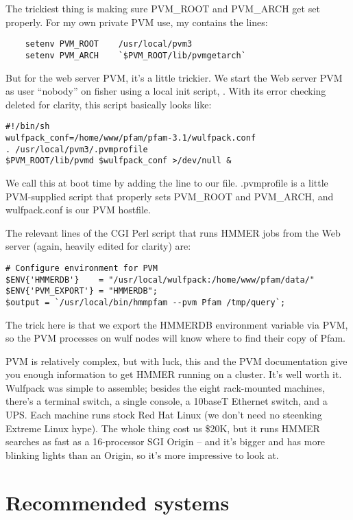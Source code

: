 The trickiest thing is making sure PVM\_ROOT and PVM\_ARCH get set
properly.  For my own private PVM use, my  contains the lines:
\begin{verbatim}
	setenv PVM_ROOT    /usr/local/pvm3
	setenv PVM_ARCH    `$PVM_ROOT/lib/pvmgetarch`
\end{verbatim}
But for the web server PVM, it's a little trickier. We start the Web
server PVM as user ``nobody'' on fisher using a local init script,
. With its error checking deleted for
clarity, this script basically looks like:

\begin{verbatim}
#!/bin/sh
wulfpack_conf=/home/www/pfam/pfam-3.1/wulfpack.conf
. /usr/local/pvm3/.pvmprofile
$PVM_ROOT/lib/pvmd $wulfpack_conf >/dev/null &
\end{verbatim}

We call this at boot time by adding the line
to our  file. .pvmprofile is a little PVM-supplied
script that properly sets PVM\_ROOT and PVM\_ARCH, and wulfpack.conf
is our PVM hostfile.

The relevant lines of the CGI Perl script that runs HMMER jobs from
the Web server (again, heavily edited for clarity) are:

\begin{verbatim}
# Configure environment for PVM
$ENV{'HMMERDB'}    = "/usr/local/wulfpack:/home/www/pfam/data/"
$ENV{'PVM_EXPORT'} = "HMMERDB";
$output = `/usr/local/bin/hmmpfam --pvm Pfam /tmp/query`;
\end{verbatim}

The trick here is that we export the HMMERDB environment variable via
PVM, so the PVM processes on wulf nodes will know where to find their
copy of Pfam.

PVM is relatively complex, but with luck, this and the PVM
documentation give you enough information to get HMMER running on a
cluster. It's well worth it.  Wulfpack was simple to assemble; besides
the eight rack-mounted machines, there's a terminal switch, a single
console, a 10baseT Ethernet switch, and a UPS. Each machine runs stock
Red Hat Linux (we don't need no steenking Extreme Linux hype). The
whole thing cost us \$20K, but it runs HMMER searches as fast as a
16-processor SGI Origin -- and it's bigger and has more blinking
lights than an Origin, so it's more impressive to look at.

\section{Recommended systems}

